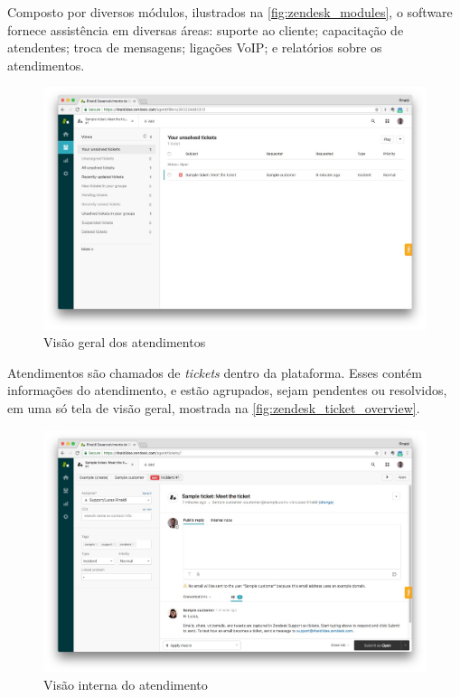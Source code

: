 Composto por diversos módulos, ilustrados na \autoref{fig:zendesk_modules}, o software fornece assistência em diversas áreas: suporte ao cliente; capacitação de atendentes; troca de mensagens; ligações VoIP; e relatórios sobre os atendimentos.

\begin{figure}[ht!]
	\centering
		\includegraphics[scale=0.2]{figures/zendesk-ticket-overview.jpg} 
	\caption{Visão geral dos atendimentos}
	\label{fig:zendesk_ticket_overview}
\end{figure}

Atendimentos são chamados de \textit{tickets} dentro da plataforma. Esses contém informações do atendimento, e estão agrupados, sejam pendentes ou resolvidos, em uma só tela de visão geral, mostrada na \autoref{fig:zendesk_ticket_overview}.

\begin{figure}[ht!]
	\centering
		\includegraphics[scale=0.2]{figures/zendesk-ticket.jpg} 
	\caption{Visão interna do atendimento}
	\label{fig:zendesk_ticket}
\end{figure}

